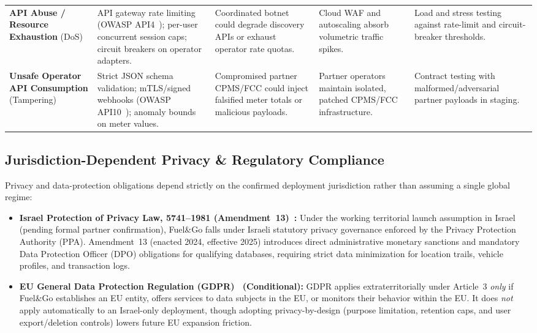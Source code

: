 \begin{table}[htbp]
{\begin{tabularx}{\linewidth}{@{}P{24mm} P{36mm} P{32mm} P{30mm} L@{}}
    \textbf{API Abuse / Resource Exhaustion} (DoS) & API gateway rate limiting (OWASP API4~\cite{owasp2023apitop10}); per-user concurrent session caps; circuit breakers on operator adapters. & Coordinated botnet could degrade discovery APIs or exhaust operator rate quotas. & Cloud WAF and autoscaling absorb volumetric traffic spikes. & Load and stress testing against rate-limit and circuit-breaker thresholds. \\
    \textbf{Unsafe Operator API Consumption} (Tampering) & Strict JSON schema validation; mTLS/signed webhooks (OWASP API10~\cite{owasp2023apitop10}); anomaly bounds on meter values. & Compromised partner CPMS/FCC could inject falsified meter totals or malicious payloads. & Partner operators maintain isolated, patched CPMS/FCC infrastructure. & Contract testing with malformed/adversarial partner payloads in staging. \\
    \bottomrule
  \end{tabularx}
  }
\end{table}

\subsection{Jurisdiction-Dependent Privacy \& Regulatory Compliance}
Privacy and data-protection obligations depend strictly on the confirmed deployment jurisdiction rather than assuming a single global regime:
\begin{itemize}[leftmargin=12pt, itemsep=2pt, topsep=2pt]
  \item \textbf{Israel Protection of Privacy Law, 5741--1981 (Amendment~13)~\cite{israel1981ppl}:} Under the working territorial launch assumption in Israel (pending formal partner confirmation), Fuel\&Go falls under Israeli statutory privacy governance enforced by the Privacy Protection Authority (PPA). Amendment~13 (enacted 2024, effective 2025) introduces direct administrative monetary sanctions and mandatory Data Protection Officer (DPO) obligations for qualifying databases, requiring strict data minimization for location trails, vehicle profiles, and transaction logs.
  \item \textbf{EU General Data Protection Regulation (GDPR)~\cite{eu2016gdpr} (Conditional):} GDPR applies extraterritorially under Article~3 \emph{only} if Fuel\&Go establishes an EU entity, offers services to data subjects in the EU, or monitors their behavior within the EU. It does \emph{not} apply automatically to an Israel-only deployment, though adopting privacy-by-design (purpose limitation, retention caps, and user export/deletion controls) lowers future EU expansion friction.
\end{itemize}
